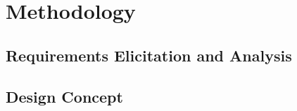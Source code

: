 \newpage
\section{Methodology}

\subsection{Requirements Elicitation and Analysis}
\subsection{Design Concept}
